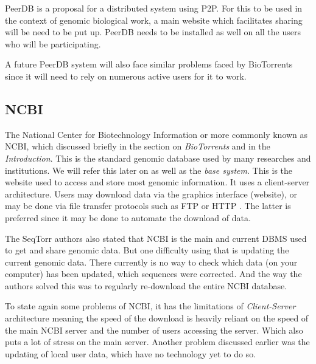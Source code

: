 \documentclass[acmsmall]{acmart}
\begin{document}
PeerDB is a proposal for a distributed system using P2P. For this to be used in the context of genomic biological work, a main website which facilitates sharing will be need to be put up. PeerDB needs to be installed as well on all the users who will be participating.

A future PeerDB system will also face similar problems faced by BioTorrents since it will need to rely on numerous active users for it to work.

\subsection{NCBI} \label{NCBI}
The National Center for Biotechnology Information or more commonly known as NCBI, which discussed briefly in the section on \textit{BioTorrents} and in the \textit{Introduction}. This is the standard genomic database used by many researches and institutions. We will refer this later on as well as the \textit{base system}. This is the website used to access and store most genomic information\cite{campbell}. It uses a client-server architecture. Users may download data via the graphics interface (website), or may be done via file transfer protocols such as FTP or HTTP \cite{biotorrents}. The latter is preferred since it may be done to automate the download of data.

The SeqTorr authors\cite{seqtorr} also stated that NCBI is the main and current DBMS used to get and share genomic data. But one difficulty using that is updating the current genomic data. There currently is no way to check which data (on your computer) has been updated, which sequences were corrected. And the way the authors solved this was to regularly re-download the entire NCBI database.

To state again some problems of NCBI, it has the limitations of \textit{Client-Server} architecture meaning the speed of the download is heavily reliant on the speed of the main NCBI server and the number of users accessing the server. Which also puts a lot of stress on the main server. Another problem discussed earlier was the updating of local user data, which have no technology yet to do so.

\end{document}
